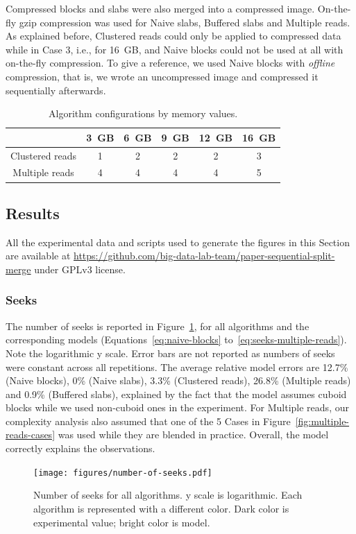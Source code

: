 \documentclass[10pt, conference, compsocconf]{IEEEtran}
\begin{document}
Compressed blocks and slabs were also merged into a compressed
image. On-the-fly gzip compression was used for Naive slabs, Buffered
slabs and Multiple reads. As explained before, Clustered reads could
only be applied to compressed data while in Case 3, i.e., for 16~GB,
and Naive blocks could not be used at all with on-the-fly
compression. To give a reference, we used Naive blocks with
\emph{offline} compression, that is, we wrote an uncompressed image
and compressed it sequentially afterwards. 

\begin{table}
  \centering
\begin{footnotesize}
\begin{tabular}{|c|ccccc|}
  \hline
                 & 3~GB & 6~GB & 9~GB & 12~GB & 16~GB\\
  \hline
  Clustered  reads &  1 &  2 &  2 &  2 &  3 \\
  Multiple reads &  4 &  4 &  4 &  4 &  5\\
  \hline
\end{tabular}
\end{footnotesize}
\caption{Algorithm configurations by memory values.}
\label{table:configs}
\end{table}

\subsection{Results}

All the experimental data and scripts used to generate the figures in
this Section are available at
\url{https://github.com/big-data-lab-team/paper-sequential-split-merge}
under GPLv3 license.

\subsubsection{Seeks}

The number of seeks is reported in Figure~\ref{fig:number-of-seeks},
for all algorithms and the corresponding models
(Equations~\ref{eq:naive-blocks}
to~\ref{eq:seeks-multiple-reads}). Note the logarithmic y scale. Error
bars are not reported as numbers of seeks were constant across all
repetitions. The average relative model errors are 12.7\% (Naive
blocks), 0\% (Naive slabs), 3.3\% (Clustered reads), 26.8\% (Multiple
reads) and 0.9\% (Buffered slabs), explained by the fact
that the model assumes cuboid blocks while we used non-cuboid ones in
the experiment. For Multiple reads, our complexity analysis also
assumed that one of the 5 Cases in
Figure~\ref{fig:multiple-reads-cases} was used while they are 
blended in practice. Overall, the model correctly explains the
observations.
\begin{figure}[h]
  \centering
  \texttt{[image: figures/number-of-seeks.pdf]}
  \hfill
  \caption{Number of seeks for all algorithms. y scale is logarithmic. Each algorithm is
    represented with a different color. Dark color is experimental
    value; bright color is model.}
\label{fig:number-of-seeks}
\end{figure}
\end{document}
